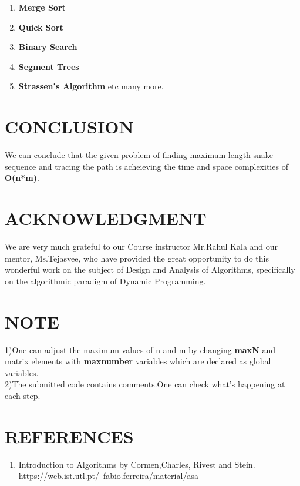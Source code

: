 \documentclass[10pt]{article}
\begin{document}
\begin{enumerate}
\item \textbf{Merge Sort}
\item \textbf{Quick Sort}
\item \textbf{Binary Search}
\item \textbf{Segment Trees}
\item  \textbf{Strassen’s Algorithm} etc many more.\fi
\end{enumerate}

\section*{CONCLUSION}

We can conclude that the given problem of finding maximum length snake sequence and tracing the path is acheieving the time and space complexities of \textbf{O(n*m)}.

\section*{ACKNOWLEDGMENT}

We are very much grateful to our Course instructor Mr.Rahul Kala and our mentor, Ms.Tejasvee, who have provided the great opportunity to do this wonderful work on the subject of Design and Analysis of Algorithms, specifically on the algorithmic  paradigm of Dynamic Programming.

\section*{NOTE}
1)One can adjust the maximum values of n and m by changing \textbf{maxN } and matrix elements with \textbf{maxnumber}  variables which are declared  as global variables.\\
2)The submitted code contains comments.One can check what's happening at each step.


\section*{REFERENCES}

\begin{enumerate}
\item Introduction to Algorithms by Cormen,Charles, Rivest and Stein.\\
https://web.ist.utl.pt/~fabio.ferreira/material/asa\\

\end{enumerate}

\end{document}
